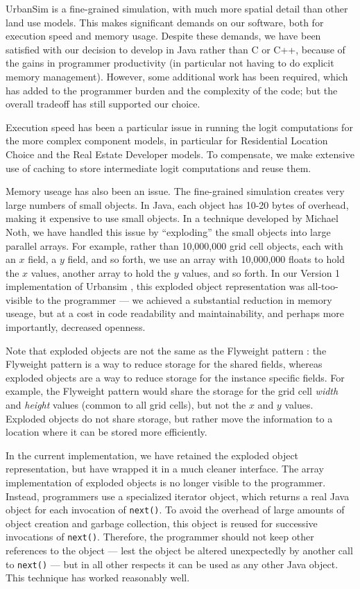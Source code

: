 \documentclass[times, 10pt,twocolumn]{article}
\begin{document}
UrbanSim is a fine-grained simulation, with much more spatial detail than
other land use models.  This makes significant demands on our software,
both for execution speed and memory usage.  Despite these demands, we have
been satisfied with our decision to develop in Java rather than C or C++,
because of the gains in programmer productivity (in particular not having
to do explicit memory management).  However, some additional work has been
required, which has added to the programmer burden and the complexity of
the code; but the overall tradeoff has still supported our choice.

Execution speed has been a particular issue in running the logit
computations for the more complex component models, in particular for
Residential Location Choice and the Real Estate Developer models.  To
compensate, we make extensive use of caching to store intermediate logit
computations and reuse them.

Memory useage has also been an issue.  The fine-grained simulation creates
very large numbers of small objects.  In Java, each object has 10-20 bytes
of overhead, making it expensive to use small objects.  In a technique
developed by Michael Noth, we have handled this issue by ``exploding'' the
small objects into large parallel arrays.  For example, rather than
10,000,000 grid cell objects, each with an $x$ field, a $y$ field, and so
forth, we use an array with 10,000,000 floats to hold the $x$ values,
another array to hold the $y$ values, and so forth.  In our Version 1
implementation of Urbansim \cite{noth-ceus-2003}, this exploded object
representation was all-too-visible to the programmer --- we achieved a
substantial reduction in memory useage, but at a cost in code readability
and maintainability, and perhaps more importantly, decreased openness.

Note that exploded objects are not the same as the Flyweight pattern
\cite{gamma-book-1995}: the Flyweight pattern is a way to reduce storage
for the shared fields, whereas exploded objects are a way to reduce storage
for the instance specific fields.  For example, the Flyweight pattern would
share the storage for the grid cell \emph{width} and \emph{height} values
(common to all grid cells), but not the $x$ and $y$ values.  Exploded
objects do not share storage, but rather move the information to a location
where it can be stored more efficiently.

In the current implementation, we have retained the exploded object
representation, but have wrapped it in a much cleaner interface.  The array
implementation of exploded objects is no longer visible to the programmer.
Instead, programmers use a specialized iterator object, which returns a
real Java object for each invocation of {\tt next()}.  To avoid the
overhead of large amounts of object creation and garbage collection, this
object is reused for successive invocations of {\tt next()}.  Therefore,
the programmer should not keep other references to the object --- lest the
object be altered unexpectedly by another call to {\tt next()} --- but in
all other respects it can be used as any other Java object.  This technique
has worked reasonably well.
\end{document}
